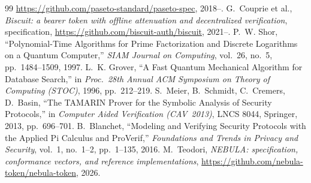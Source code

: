\documentclass[11pt]{article}
\begin{document}
\begin{thebibliography}{99}
\url{https://github.com/paseto-standard/paseto-spec}, 2018--.
 G.~Couprie et al., \emph{Biscuit: a bearer token with
offline attenuation and decentralized verification}, specification,
\url{https://github.com/biscuit-auth/biscuit}, 2021--.
 P.~W. Shor, ``Polynomial-Time Algorithms for Prime
Factorization and Discrete Logarithms on a Quantum Computer,'' \emph{SIAM
Journal on Computing}, vol.~26, no.~5, pp.~1484--1509, 1997.
 L.~K. Grover, ``A Fast Quantum Mechanical Algorithm for
Database Search,'' in \emph{Proc.\ 28th Annual ACM Symposium on Theory of
Computing (STOC)}, 1996, pp.~212--219.
 S.~Meier, B.~Schmidt, C.~Cremers, D.~Basin, ``The TAMARIN
Prover for the Symbolic Analysis of Security Protocols,'' in \emph{Computer
Aided Verification (CAV~2013)}, LNCS 8044, Springer, 2013, pp.~696--701.
 B.~Blanchet, ``Modeling and Verifying Security Protocols
with the Applied Pi Calculus and ProVerif,'' \emph{Foundations and Trends in
Privacy and Security}, vol.~1, no.~1--2, pp.~1--135, 2016.
 M.~Teodori, \emph{NEBULA: specification, conformance
vectors, and reference implementations},
\url{https://github.com/nebula-token/nebula-token}, 2026.
\end{thebibliography}
\end{document}
